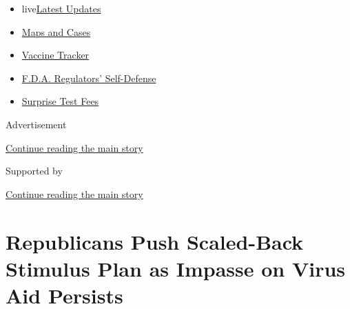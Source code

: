 \begin{itemize}
\tightlist
\item
  live\href{https://www.nytimes3xbfgragh.onion/2020/09/12/world/covid-19-coronavirus.html?name=styln-coronavirus-national\&region=TOP_BANNER\&block=storyline_menu_recirc\&action=click\&pgtype=Article\&impression_id=f5bde350-f52c-11ea-a213-4b5d07e8d7c1\&variant=undefined}{Latest
  Updates}
\item
  \href{https://www.nytimes3xbfgragh.onion/interactive/2020/us/coronavirus-us-cases.html?name=styln-coronavirus-national\&region=TOP_BANNER\&block=storyline_menu_recirc\&action=click\&pgtype=Article\&impression_id=f5bde351-f52c-11ea-a213-4b5d07e8d7c1\&variant=undefined}{Maps
  and Cases}
\item
  \href{https://www.nytimes3xbfgragh.onion/interactive/2020/science/coronavirus-vaccine-tracker.html?name=styln-coronavirus-national\&region=TOP_BANNER\&block=storyline_menu_recirc\&action=click\&pgtype=Article\&impression_id=f5bde352-f52c-11ea-a213-4b5d07e8d7c1\&variant=undefined}{Vaccine
  Tracker}
\item
  \href{https://www.nytimes3xbfgragh.onion/2020/09/10/us/politics/fda-coronavirus-vaccine.html?name=styln-coronavirus-national\&region=TOP_BANNER\&block=storyline_menu_recirc\&action=click\&pgtype=Article\&impression_id=f5bde353-f52c-11ea-a213-4b5d07e8d7c1\&variant=undefined}{F.D.A.
  Regulators' Self-Defense}
\item
  \href{https://www.nytimes3xbfgragh.onion/2020/09/09/upshot/coronavirus-surprise-test-fees.html?name=styln-coronavirus-national\&region=TOP_BANNER\&block=storyline_menu_recirc\&action=click\&pgtype=Article\&impression_id=f5bde354-f52c-11ea-a213-4b5d07e8d7c1\&variant=undefined}{Surprise
  Test Fees}
\end{itemize}

Advertisement

\protect\hyperlink{after-top}{Continue reading the main story}

Supported by

\protect\hyperlink{after-sponsor}{Continue reading the main story}

\hypertarget{republicans-push-scaled-back-stimulus-plan-as-impasse-on-virus-aid-persists}{%
\section{Republicans Push Scaled-Back Stimulus Plan as Impasse on Virus
Aid
Persists}\label{republicans-push-scaled-back-stimulus-plan-as-impasse-on-virus-aid-persists}}

